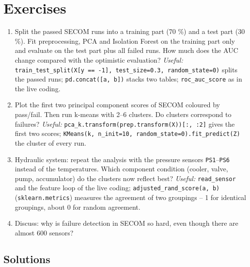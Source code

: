 \documentclass[
  letterpaper,
  DIV=11,
  numbers=noendperiod]{scrreprt}
\providecommand{\tightlist}{%
  \setlength{\itemsep}{0pt}\setlength{\parskip}{0pt}}\usepackage{longtable,booktabs,array}
\begin{document}
\section{Exercises}\label{exercises-9}

\begin{enumerate}
\def\labelenumi{\arabic{enumi}.}
\tightlist
\item
  Split the passed SECOM runs into a training part (70 \%) and a test
  part (30 \%). Fit preprocessing, PCA and Isolation Forest on the
  training part only and evaluate on the test part plus all failed runs.
  How much does the AUC change compared with the optimistic evaluation?
  \emph{Useful:}
  \texttt{train\_test\_split(X{[}y\ ==\ -1{]},\ test\_size=0.3,\ random\_state=0)}
  splits the passed runs; \texttt{pd.concat({[}a,\ b{]})} stacks two
  tables; \texttt{roc\_auc\_score} as in the live coding.
\item
  Plot the first two principal component scores of SECOM coloured by
  pass/fail. Then run k-means with 2--6 clusters. Do clusters correspond
  to failures? \emph{Useful:}
  \texttt{pca\_k.transform(prep.transform(X)){[}:,\ :2{]}} gives the
  first two scores;
  \texttt{KMeans(k,\ n\_init=10,\ random\_state=0).fit\_predict(Z)} the
  cluster of every run.
\item
  Hydraulic system: repeat the analysis with the pressure sensors
  \texttt{PS1}--\texttt{PS6} instead of the temperatures. Which
  component condition (cooler, valve, pump, accumulator) do the clusters
  now reflect best? \emph{Useful:} \texttt{read\_sensor} and the feature
  loop of the live coding; \texttt{adjusted\_rand\_score(a,\ b)}
  (\texttt{sklearn.metrics}) measures the agreement of two groupings --
  1 for identical groupings, about 0 for random agreement.
\item
  Discuss: why is failure detection in SECOM so hard, even though there
  are almost 600 sensors?
\end{enumerate}

\subsection{Solutions}\label{solutions-9}
\end{document}
